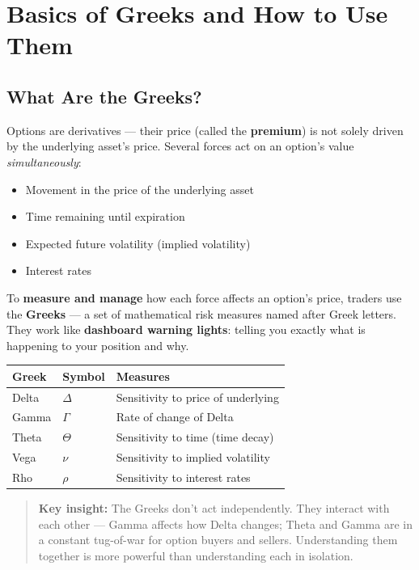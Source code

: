 \documentclass[12pt,openany]{book}
\begin{document}
\section{Basics of Greeks and How to Use Them}

\subsection{What Are the Greeks?}

Options are derivatives — their price (called the \textbf{premium}) is not solely driven by the underlying asset's price.
Several forces act on an option's value \emph{simultaneously}:

\begin{itemize}[leftmargin=*]
    \item Movement in the price of the underlying asset
    \item Time remaining until expiration
    \item Expected future volatility (implied volatility)
    \item Interest rates
\end{itemize}

To \textbf{measure and manage} how each force affects an option's price, traders use the \textbf{Greeks} — a set of mathematical risk measures named after Greek letters.
They work like \textbf{dashboard warning lights}: telling you exactly what is happening to your position and why.

\begin{center}
\scriptsize
\setlength{\tabcolsep}{3pt}
\begin{tabular}{|L{4.1cm}|L{4.1cm}|L{4.1cm}|}
\hline
\textbf{Greek} & \textbf{Symbol} & \textbf{Measures} \\
\hline
Delta & \(\Delta\) & Sensitivity to price of underlying \\
\hline
Gamma & \(\Gamma\) & Rate of change of Delta \\
\hline
Theta & \(\Theta\) & Sensitivity to time (time decay) \\
\hline
Vega & \(\nu\) & Sensitivity to implied volatility \\
\hline
Rho & \(\rho\) & Sensitivity to interest rates \\
\hline
\end{tabular}
\end{center}

\begin{quote}
\textbf{Key insight:} The Greeks don't act independently. They interact with each other — Gamma affects how Delta changes; Theta and Gamma are in a constant tug-of-war for option buyers and sellers. Understanding them together is more powerful than understanding each in isolation.
\end{quote}
\end{document}
